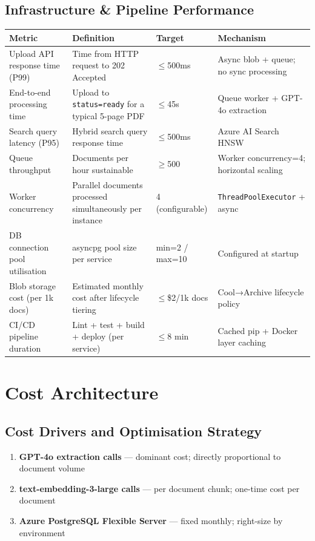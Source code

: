 \documentclass[12pt,a4paper]{article}
\newcommand{\codeinline}[1]{\texttt{\small\color{NordicBlue}#1}}
\begin{document}
\subsection{Infrastructure \& Pipeline Performance}

\begin{tabularx}{\textwidth}{lXll}
\toprule
\textbf{Metric} & \textbf{Definition} & \textbf{Target} & \textbf{Mechanism} \\
\midrule
Upload API response time (P99) & Time from HTTP request to 202 Accepted & $\leq$500ms & Async blob + queue; no sync processing \\
End-to-end processing time & Upload to \codeinline{status=ready} for a typical 5-page PDF & $\leq$45s & Queue worker + GPT-4o extraction \\
Search query latency (P95) & Hybrid search query response time & $\leq$500ms & Azure AI Search HNSW \\
Queue throughput & Documents per hour sustainable & $\geq$500 & Worker concurrency=4; horizontal scaling \\
Worker concurrency & Parallel documents processed simultaneously per instance & 4 (configurable) & \codeinline{ThreadPoolExecutor} + async \\
DB connection pool utilisation & asyncpg pool size per service & min=2 / max=10 & Configured at startup \\
Blob storage cost (per 1k docs) & Estimated monthly cost after lifecycle tiering & $\leq$\$2/1k docs & Cool→Archive lifecycle policy \\
CI/CD pipeline duration & Lint + test + build + deploy (per service) & $\leq$8 min & Cached pip + Docker layer caching \\
\bottomrule
\end{tabularx}

\newpage

\section{Cost Architecture}

\subsection{Cost Drivers and Optimisation Strategy}

\begin{tcolorbox}[colback=LightBg, colframe=NordicGold, boxrule=1.2pt, arc=4pt,
  title={\small\textbf{The three largest cost levers in this architecture}}]
\begin{enumerate}[leftmargin=*, itemsep=4pt]
  \item \textbf{GPT-4o extraction calls} — dominant cost; directly proportional to document volume
  \item \textbf{text-embedding-3-large calls} — per document chunk; one-time cost per document
  \item \textbf{Azure PostgreSQL Flexible Server} — fixed monthly; right-size by environment
\end{enumerate}
\end{tcolorbox}
\end{document}

